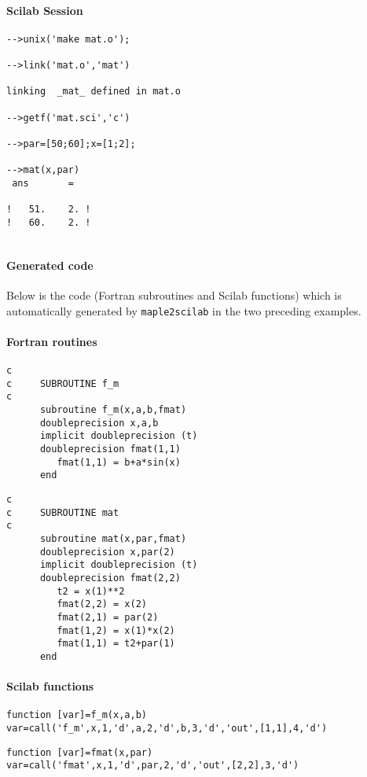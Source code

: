 \paragraph{Scilab Session}
\begin{verbatim}
-->unix('make mat.o');

-->link('mat.o','mat') 

linking  _mat_ defined in mat.o  
 
-->getf('mat.sci','c')

-->par=[50;60];x=[1;2];
 
-->mat(x,par)
 ans       =
 
!   51.    2. !
!   60.    2. !
 
\end{verbatim}

{\small
\paragraph{Generated code}
Below is the code (Fortran subroutines and Scilab functions) which is 
automatically generated by {\tt maple2scilab} in the two preceding  examples.
\paragraph{Fortran routines}
\begin{verbatim}
c      
c     SUBROUTINE f_m
c      
      subroutine f_m(x,a,b,fmat)
      doubleprecision x,a,b
      implicit doubleprecision (t)
      doubleprecision fmat(1,1)
         fmat(1,1) = b+a*sin(x)
      end
\end{verbatim}
\begin{verbatim}
c      
c     SUBROUTINE mat
c      
      subroutine mat(x,par,fmat)
      doubleprecision x,par(2)
      implicit doubleprecision (t)
      doubleprecision fmat(2,2)
         t2 = x(1)**2
         fmat(2,2) = x(2)
         fmat(2,1) = par(2)
         fmat(1,2) = x(1)*x(2)
         fmat(1,1) = t2+par(1)
      end
\end{verbatim}
\paragraph{Scilab functions}
\begin{verbatim}
function [var]=f_m(x,a,b)
var=call('f_m',x,1,'d',a,2,'d',b,3,'d','out',[1,1],4,'d')
\end{verbatim}
\begin{verbatim}
function [var]=fmat(x,par)
var=call('fmat',x,1,'d',par,2,'d','out',[2,2],3,'d')
\end{verbatim}
}

